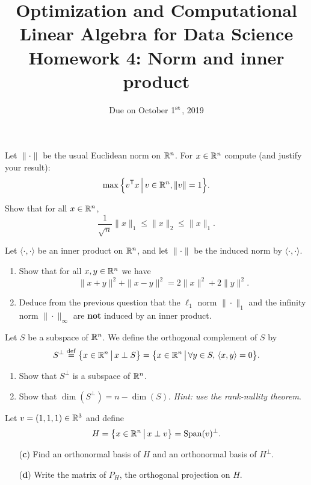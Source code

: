 \documentclass[11pt,nocut]{article}
\title{\vspace{-3.0cm}%
	Optimization and Computational Linear Algebra for Data Science\\
Homework 4: Norm and inner product}
\date{\vspace{-1cm}Due on October 1$^{\rm st}$, 2019}
\begin{document}
\maketitle




\begin{problem}[2 points]
	Let $\| \cdot \|$ be the usual Euclidean norm on $\mathbb{R}^n$.
	For $x \in \mathbb{R}^n$ compute (and justify your result):
	$$
	\max \Big\{ v^{{\sf T}} x \, \Big| \, v \in \mathbb{R}^n, \|v\|=1 \Big\}.
$$
\end{problem}

\vspace{1mm} 

\begin{problem}[2 points]
	Show that for all $x \in \mathbb{R}^n$,
	$$
	\frac{1}{\sqrt{n}} \|x\|_1 \leq \|x\|_2 \leq \|x\|_1.
	$$
\end{problem}

\vspace{1mm}

\begin{problem}[2 points]
	Let $\langle \cdot, \cdot \rangle$ be an inner product on $\mathbb{R}^n$, and let $\| \cdot \|$ be the induced norm by $\langle \cdot, \cdot \rangle$.
	\begin{enumerate}[label=\normalfont(\textbf{\alph*})]
		\item Show that for all $x,y \in \mathbb{R}^n$ we have
			$$
			\|x+y\|^2 + \|x-y\|^2 = 2 \|x\|^2 + 2 \|y\|^2.
			$$
		\item Deduce from the previous question that the $\ell_1$ norm $\| \cdot \|_1$ and the infinity norm $\| \cdot \|_{\infty}$ are \textbf{not} induced by an inner product.
	\end{enumerate}
\end{problem}

\vspace{1mm}

\begin{problem}[4 points]
	Let $S$ be a subspace of $\mathbb{R}^n$. We define the orthogonal complement of $S$ by
	$$
	S^{\perp} \overset{\rm def}{=} 
	\big\{ x \in \mathbb{R}^n \, \big| \, x \perp S \big\} = 
	\big\{ x \in \mathbb{R}^n \, \big| \, \forall y \in S, \, \langle x,y \rangle = 0 \big\}.
	$$
	\begin{enumerate}[label=\normalfont(\textbf{\alph*})]
		\item Show that $S^{\perp}$ is a subspace of $\mathbb{R}^n$.
		\item Show that $\dim(S^{\perp}) = n - \dim(S)$. \textit{Hint: use the rank-nullity theorem}.
	\end{enumerate}
	Let $v = (1,1,1) \in \mathbb{R}^3$ and define
	$$
	H = 
	\big\{ x \in \mathbb{R}^n \, \big| \, x \perp v \big\} = {{\rm Span}}(v)^{\perp}.
	$$
	\begin{enumerate}[label=\normalfont(\textbf{\alph*})]
		\item[\normalfont(\textbf{c})] Find an orthonormal basis of $H$ and an orthonormal basis of $H^{\perp}$.
		\item[\normalfont(\textbf{d})] Write the matrix of $P_H$, the orthogonal projection on $H$.
	\end{enumerate}
\end{problem}
\end{document}
